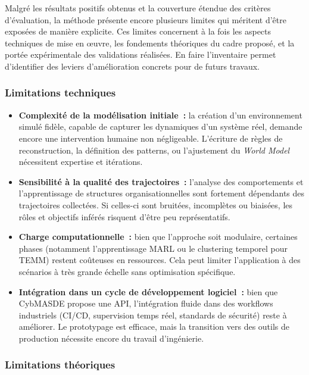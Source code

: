 \noindent
Malgré les résultats positifs obtenus et la couverture étendue des critères d’évaluation, la méthode  présente encore plusieurs limites qui méritent d’être exposées de manière explicite. Ces limites concernent à la fois les aspects techniques de mise en œuvre, les fondements théoriques du cadre proposé, et la portée expérimentale des validations réalisées. En faire l’inventaire permet d’identifier des leviers d’amélioration concrets pour de futurs travaux.

\subsubsection*{Limitations techniques}

\begin{itemize}
    \item \textbf{Complexité de la modélisation initiale~:} la création d’un environnement simulé fidèle, capable de capturer les dynamiques d’un système réel, demande encore une intervention humaine non négligeable. L’écriture de règles de reconstruction, la définition des patterns, ou l’ajustement du \textit{World Model} nécessitent expertise et itérations.

    \item \textbf{Sensibilité à la qualité des trajectoires~:} l’analyse des comportements et l’apprentissage de structures organisationnelles sont fortement dépendants des trajectoires collectées. Si celles-ci sont bruitées, incomplètes ou biaisées, les rôles et objectifs inférés risquent d’être peu représentatifs.

    \item \textbf{Charge computationnelle~:} bien que l’approche soit modulaire, certaines phases (notamment l’apprentissage MARL ou le clustering temporel pour TEMM) restent coûteuses en ressources. Cela peut limiter l’application à des scénarios à très grande échelle sans optimisation spécifique.

    \item \textbf{Intégration dans un cycle de développement logiciel~:} bien que CybMASDE propose une API, l’intégration fluide dans des workflows industriels (CI/CD, supervision temps réel, standards de sécurité) reste à améliorer. Le prototypage est efficace, mais la transition vers des outils de production nécessite encore du travail d’ingénierie.
\end{itemize}

\subsubsection*{Limitations théoriques}


